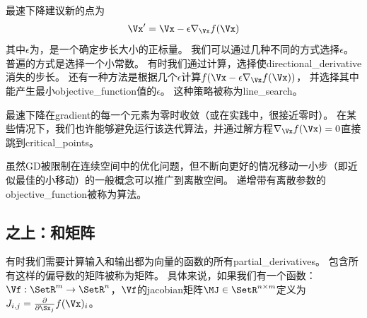 最速下降建议新的点为
\begin{align}
  \Vx' = \Vx - \epsilon \nabla_{\Vx} f(\Vx)
\end{align}
其中$\epsilon$为，是一个确定步长大小的正标量。
我们可以通过几种不同的方式选择$\epsilon$。
普遍的方式是选择一个小常数。
有时我们通过计算，选择使\gls{directional_derivative}消失的步长。
还有一种方法是根据几个$\epsilon$计算$f(\Vx - \epsilon \nabla_{\Vx} f(\Vx))$， 并选择其中能产生最小\gls{objective_function}值的$\epsilon$。
这种策略被称为\gls{line_search}。

最速下降在\gls{gradient}的每一个元素为零时收敛（或在实践中，很接近零时）。
在某些情况下，我们也许能够避免运行该迭代算法，并通过解方程$\nabla_{\Vx} f(\Vx)= 0$直接跳到\gls{critical_points}。


虽然\gls{GD}被限制在连续空间中的优化问题，但不断向更好的情况移动一小步（即近似最佳的小移动）的一般概念可以推广到离散空间。
递增带有离散参数的\gls{objective_function}被称为算法\citep{Russel+Norvig-book2003}。

\subsection{之上：和矩阵}
\label{sec:beyond_the_gradient_jacobian_and_hessian_matrices}
有时我们需要计算输入和输出都为向量的函数的所有\gls{partial_derivatives}。
包含所有这样的偏导数的矩阵被称为矩阵。
具体来说，如果我们有一个函数：$\Vf: \SetR^m \rightarrow \SetR^n$，$\Vf$的\gls{jacobian}矩阵$\MJ \in \SetR^{n \times m}$定义为$J_{i,j} = \frac{\partial}{\partial \Sx_j} f(\Vx)_i$。

